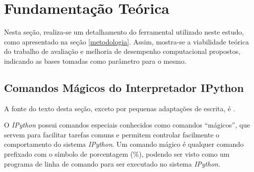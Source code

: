 \documentclass[12pt]{article}
\newcommand{\aspas}[1]{``#1''} %
\begin{document}

\section{Fundamentação Teórica}
\label{fundamentacao}

Nesta seção, realiza-se um detalhamento do ferramental utilizado neste estudo, como apresentado na seção \ref{metodologia}. Assim, mostra-se a viabilidade teórica do trabalho de avaliação e melhoria de desempenho computacional propostos, indicando as bases tomadas como parâmetro para o mesmo.

\subsection{Comandos Mágicos do Interpretador IPython}

A fonte do texto desta seção, exceto por pequenas adaptações de escrita, é \cite{mckinney:2018}.

%

O \textit{IPython} possui comandos especiais conhecidos como comandos \aspas{mágicos}, que servem para facilitar tarefas comuns e permitem controlar facilmente o comportamento do sistema \textit{IPython}. Um comando mágico é qualquer comando prefixado com o símbolo de porcentagem (\%), podendo ser visto como um programa de linha de comando para ser executado no sistema \textit{IPython}.
\end{document}
